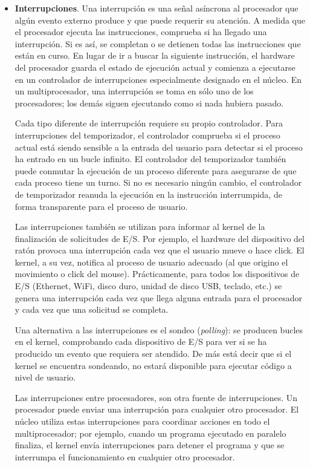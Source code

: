 \documentclass[10pt]{book}
\begin{document}
\begin{itemize}
\item \textbf{Interrupciones}. Una interrupción es una señal asíncrona al procesador que algún evento externo produce y que puede requerir su atención. A medida que el procesador ejecuta las instrucciones, comprueba si ha llegado una interrupción. Si es así, se completan o se detienen todas las instrucciones que están en curso. En lugar de ir a buscar la siguiente instrucción, el hardware del procesador guarda el estado de ejecución actual y comienza a ejecutarse en un controlador de interrupciones especialmente designado en el núcleo. En un multiprocesador, una interrupción se toma en sólo uno de los procesadores; los demás siguen ejecutando como si nada hubiera pasado.

Cada tipo diferente de interrupción requiere su propio controlador. Para interrupciones del temporizador, el controlador comprueba si el proceso actual está siendo sensible a la entrada del usuario para detectar si el proceso ha entrado en un bucle infinito. El controlador del temporizador también puede conmutar la ejecución de un proceso diferente para asegurarse de que cada proceso tiene un turno. Si no es necesario ningún cambio, el controlador de temporizador reanuda la ejecución en la instrucción interrumpida, de forma transparente para el proceso de usuario.

Las interrupciones también se utilizan para informar al kernel de la finalización de solicitudes de E/S. Por ejemplo, el hardware del dispositivo del ratón provoca una interrupción cada vez que el usuario mueve o hace click. El kernel, a su vez, notifica al proceso de usuario adecuado (al que origino el movimiento o click del mouse). Prácticamente, para todos los dispositivos de E/S (Ethernet, WiFi, disco duro, unidad de disco USB, teclado, etc.) se genera una interrupción cada vez que llega alguna entrada para el procesador y cada vez que una solicitud se completa.

Una alternativa a las interrupciones es el sondeo (\textit{polling}): se producen bucles en el kernel, comprobando cada dispositivo de E/S para ver si se ha producido un evento que requiera ser atendido. De más está decir que si el kernel se encuentra sondeando, no estará disponible para ejecutar código a nivel de usuario.

Las interrupciones entre procesadores, son otra fuente de interrupciones. Un procesador puede enviar una interrupción para cualquier otro procesador. El núcleo utiliza estas interrupciones para coordinar acciones en todo el multiprocesador; por ejemplo, cuando un programa ejecutado en paralelo finaliza, el kernel envía interrupciones para detener el programa y que se interrumpa el funcionamiento en cualquier otro procesador.


\end{itemize}
\end{document}
